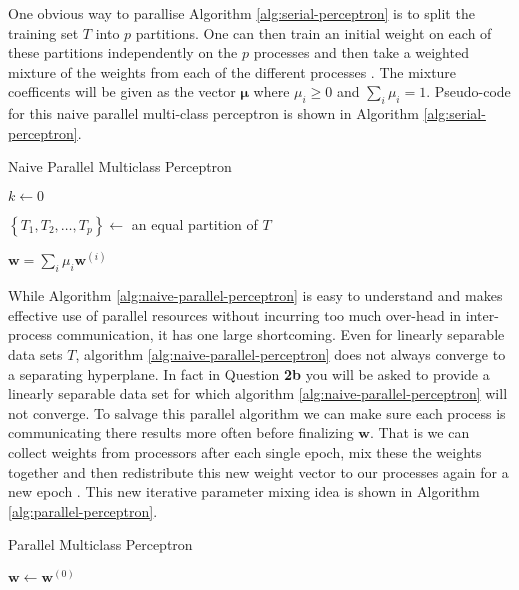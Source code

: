 One obvious way to parallise Algorithm \ref{alg:serial-perceptron} is to split the training set $T$ into $p$ partitions. One can then train an initial weight on each of these partitions independently on the $p$ processes and then take a weighted mixture of the weights from each of the different processes \cite{10.5555/1857999.1858068}. The mixture coefficents will be given as the vector $\bm{\mu}$ where $\mu_{i} \geq 0$ and $\sum_{i} \mu_{i} = 1$. Pseudo-code for this naive parallel multi-class perceptron is shown in Algorithm \ref{alg:serial-perceptron}.
\begin{algorithm}[ht!!!]
    \caption{Naive Parallel Multiclass Perceptron}
    \label{alg:naive-parallel-perceptron}
    \SetAlgoLined
    \BlankLine
    $k \gets 0$\;
    
    $\left\lbrace T_{1} , T_{2}, \ldots , T_{p} \right\rbrace \gets$ an equal partition of $T$\;
    
    $\bm{w} = \sum_{i} \mu_{i} \bm{w}^{(i)}$\;
    
    \BlankLine
\end{algorithm}
While Algorithm \ref{alg:naive-parallel-perceptron} is easy to understand and makes effective use of parallel resources without incurring too much over-head in inter-process communication, it has one large shortcoming. Even for linearly separable data sets $T$, algorithm \ref{alg:naive-parallel-perceptron} does not always converge to a separating hyperplane. In fact in Question {\bf 2b} you will be asked to provide a linearly separable data set for which algorithm \ref{alg:naive-parallel-perceptron} will not converge. To salvage this parallel algorithm we can make sure each process is communicating there results more often before finalizing $\bm{w}$. That is we can collect weights from processors after each single epoch, mix these the weights together and then redistribute this new weight vector to our processes again for a new epoch \cite{10.5555/1857999.1858068}. This new iterative parameter mixing idea is shown in Algorithm \ref{alg:parallel-perceptron}.
\begin{algorithm}[ht!!!]
    \caption{Parallel Multiclass Perceptron}
    \label{alg:parallel-perceptron}
    \SetAlgoLined
    \BlankLine
    $\bm{w} \gets \bm{w}^{(0)}$\;
    \BlankLine
\end{algorithm}
